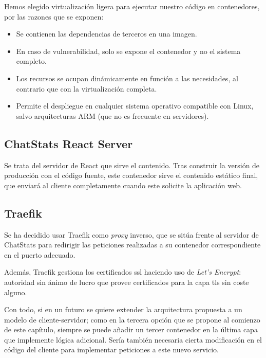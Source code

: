 Hemos elegido virtualización ligera para ejecutar nuestro código en contenedores, por las razones que se exponen:

\begin{itemize}
	\item Se contienen las dependencias de terceros en una imagen.
	\item En caso de vulnerabilidad, solo se expone el contenedor y no el sistema completo.
	\item Los recursos se ocupan dinámicamente en función a las necesidades, al contrario que con la virtualización completa.
	\item Permite el despliegue en cualquier sistema operativo compatible con Linux, salvo arquitecturas ARM (que no es frecuente en servidores).
\end{itemize}

\subsection{ChatStats React Server}

Se trata del servidor de React que sirve el contenido. Tras construir la versión de producción con el código fuente, este contenedor sirve el contenido estático final, que enviará al cliente completamente cuando este solicite la aplicación web.

\subsection{Traefik}

Se ha decidido usar Traefik como \textit{proxy} inverso, que se sitúa frente al servidor de ChatStats para redirigir las peticiones realizadas a su contenedor correspondiente en el puerto adecuado.

Además, Traefik gestiona los certificados \acrshort{ssl} haciendo uso de \textit{Let's Encrypt}: autoridad sin ánimo de lucro que provee certificados para la capa \acrshort{tls} sin coste alguno.

\vspace{8mm}

Con todo, si en un futuro se quiere extender la arquitectura propuesta a un modelo de cliente-servidor; como en la tercera opción que se propone al comienzo de este capítulo, siempre se puede añadir un tercer contenedor en la última capa que implemente lógica adicional. Sería también necesaria cierta modificación en el código del cliente para implementar peticiones a este nuevo servicio.



